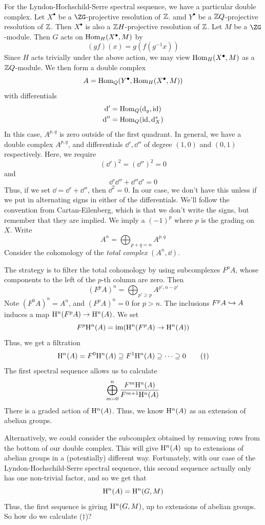 \documentclass{article}
\begin{document}
For the Lyndon-Hochschild-Serre spectral sequence, we have a particular double complex. Let \(X^\bullet\) be a \(\ZG\)-projective resolution of \(\mathbb{Z}\). amd \(Y^\bullet\) be a \(\mathbb{Z} Q\)-projective resolution of \(\mathbb{Z}\). Then \(X^\bullet\) is also a \(\mathbb{Z} H\)-projective resolution of \(\mathbb{Z}\). Let \(M\) be a \(\ZG\)-module. Then \(G\) acts on \(\operatorname{Hom}_H(X^\bullet, M)\) by
\[(gf)(x) = g(f(g^{-1}x))\]
Since \(H\) acts trivially under the above action, we may view \(\operatorname{Hom}_H(X^\bullet, M)\) as a \(\mathbb{Z} Q\)-module. We then form a double complex
\[A = \operatorname{Hom}_Q(Y^\bullet, \operatorname{Hom}_H(X^\bullet, M))\]
with differentials
\begin{align*}
    \dd' &= \operatorname{Hom}_Q(\dd_y, \operatorname{id}) \\
    \dd'' &= \operatorname{Hom}_Q(\operatorname{id}, \dd_X^*)
\end{align*}
In this case, \(A^{p,q}\) is zero outside of the first quadrant. In general, we have a double complex \(A^{p, q}\), and differentials \(\dd', \dd''\) of degree \((1, 0)\) and \((0, 1)\) respectively. Here, we require
\[(\dd')^2 = (\dd'')^2 = 0\]
and
\[\dd' \dd'' + \dd'' \dd' = 0\]
Thus,  if we set \(\dd = \dd' + \dd''\), then \(\dd^2 = 0\). In our case, we don't have this unless if we put in alternating signs in either of the differentials. We'll follow the convention from Cartan-Eilenberg, which is that we don't write the signs, but remember that they are implied. We imply a \((-1)^p\) where \(p\) is the grading on \(X\). Write
\[A^n = \bigoplus_{p+q = n}A^{p,q}\]
Consider the cohomology of the \emph{total complex} \((A^n, \dd)\).

The strategy is to filter the total cohomology by using subcomplexes \(F^pA\), whose components to the left of the \(p\)-th column are zero. Then
\[(F^pA)^n = \bigoplus_{p' \ge p}A^{p', n - p'}\]
Note \((F^0A)^n = A^n\), and \((F^pA)^n = 0\) for \(p > n\). The inclusions \(F^pA \hookrightarrow A\) induces a map \(\mathrm{H}^n(F^pA) \to \mathrm{H}^n(A)\). We set
\[F^p\mathrm{H}^n(A) = \operatorname{im}(\mathrm{H}^n(F^pA) \to \mathrm{H}^n(A))\]
Thus, we get a filtration
\[\mathrm{H}^n(A) = F^0\mathrm{H}^n(A) \supseteq F^1\mathrm{H}^n(A) \supseteq \cdots \supseteq 0 \tag{\(\dagger\)}\]
The first spectral sequence allows us to calculate
\[\bigoplus_{m=0}^n\frac{F^m\mathrm{H}^n(A)}{F^{m+1}\mathrm{H}^n(A)}\]
There is a graded action of \(\mathrm{H}^n(A)\). Thus, we know \(\mathrm{H}^n(A)\) as an extension of abelian groups.

Alternatively, we could consider the subcomplex obtained by removing rows from the bottom of our double complex. This will give \(\mathrm{H}^n(A)\) up to extensions of abelian groups in a (potentially) different way. Fortunately, with our case of the Lyndon-Hochschild-Serre spectral sequence, this second sequence actually only has one non-trivial factor, and so we get that
\[\mathrm{H}^n(A) = \mathrm{H}^n(G, M)\]
Thus, the first sequence is giving \(\mathrm{H}^n(G, M)\), up to extensions of abelian groups. So how do we calculate (\(\dagger\))?
\end{document}
